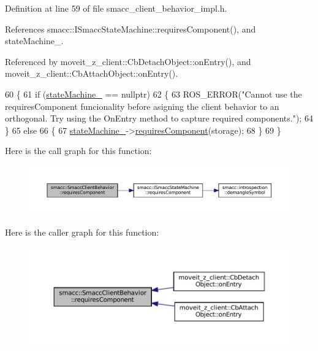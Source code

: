 Definition at line 59 of file smacc\+\_\+client\+\_\+behavior\+\_\+impl.\+h.



References smacc\+::\+I\+Smacc\+State\+Machine\+::requires\+Component(), and state\+Machine\+\_\+.



Referenced by moveit\+\_\+z\+\_\+client\+::\+Cb\+Detach\+Object\+::on\+Entry(), and moveit\+\_\+z\+\_\+client\+::\+Cb\+Attach\+Object\+::on\+Entry().


\begin{DoxyCode}
60 \{
61     \textcolor{keywordflow}{if} (\hyperlink{classsmacc_1_1SmaccClientBehavior_a7950b5684d6de0a8e8959c0936ce9a19}{stateMachine\_} == \textcolor{keyword}{nullptr})
62     \{
63         ROS\_ERROR(\textcolor{stringliteral}{"Cannot use the requiresComponent funcionality before asigning the client behavior to an
       orthogonal. Try using the OnEntry method to capture required components."});
64     \}
65     \textcolor{keywordflow}{else}
66     \{
67         \hyperlink{classsmacc_1_1SmaccClientBehavior_a7950b5684d6de0a8e8959c0936ce9a19}{stateMachine\_}->\hyperlink{classsmacc_1_1ISmaccStateMachine_aa6b25e28f3bce24c4b356dc865a9eb7b}{requiresComponent}(storage);
68     \}
69 \}
\end{DoxyCode}
Here is the call graph for this function\+:
\nopagebreak
\begin{figure}[H]
\begin{center}
\leavevmode
\includegraphics[width=350pt]{classsmacc_1_1SmaccClientBehavior_adee6abe3a28aa6b47d3dd5267e264b4d_cgraph}
\end{center}
\end{figure}
Here is the caller graph for this function\+:
\nopagebreak
\begin{figure}[H]
\begin{center}
\leavevmode
\includegraphics[width=350pt]{classsmacc_1_1SmaccClientBehavior_adee6abe3a28aa6b47d3dd5267e264b4d_icgraph}
\end{center}
\end{figure}
\mbox{\label{classsmacc_1_1SmaccClientBehavior_a228b90d814511a24907c5d65553bcba2}} 

